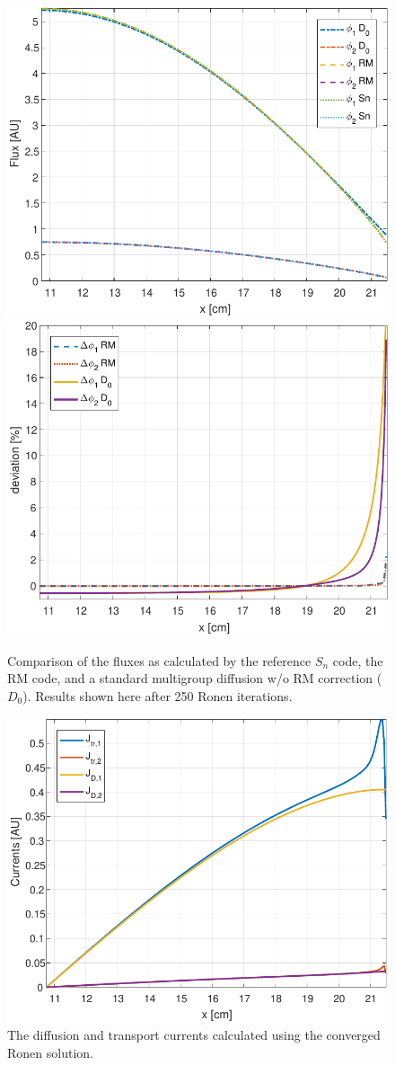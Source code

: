 \begin{figure}[htbp!]
	\centering
	\includegraphics[width=0.45\linewidth]{flux0_half.pdf}
	\includegraphics[width=0.45\linewidth]{flux_deviation_half.pdf}	
	\caption{Comparison of the fluxes as calculated by the reference $S_n$ code, the RM code, and a standard multigroup diffusion w/o RM correction ($D_0$). Results shown here after 250 Ronen iterations.}
	\label{fig:fluxes}
\end{figure}

\begin{figure}[htbp!]
	\centering
	\includegraphics[width=0.45\linewidth]{current_half.pdf}	
	\caption{The diffusion and transport currents calculated using the converged Ronen solution.}
	\label{fig:current}
\end{figure}

